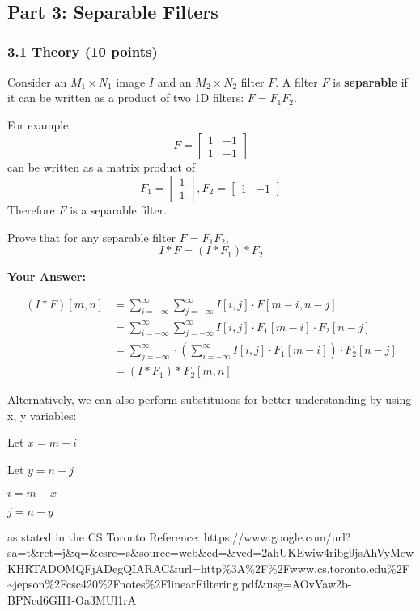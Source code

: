 \documentclass[11pt]{article}
\begin{document}
    \begin{center}
    \end{center}
    { \hspace*{\fill} \\}
    
    \subsection{Part 3: Separable Filters}\label{part-3-separable-filters}

    \subsubsection{3.1 Theory (10 points)}\label{theory-10-points}

Consider an \(M_1\times{N_1}\) image \(I\) and an \(M_2\times{N_2}\)
filter \(F\). A filter \(F\) is \textbf{separable} if it can be written
as a product of two 1D filters: \(F=F_1F_2\).

For example, \[F=
\begin{bmatrix}
1 & -1 \\
1 & -1
\end{bmatrix}
\] can be written as a matrix product of \[F_1=
\begin{bmatrix}
1  \\
1
\end{bmatrix},
F_2=
\begin{bmatrix}
1 & -1
\end{bmatrix}
\] Therefore \(F\) is a separable filter.

Prove that for any separable filter \(F=F_1F_2\), \[I*F=(I*F_1)*F_2\]

    \textbf{Your Answer:}

\begin{align*}
(I*F) [m,n] &= \sum_{i=-\infty}^\infty \sum_{j=-\infty}^\infty I[i,j]\cdot F[m-i,n-j]\\
&= \sum_{i=-\infty}^\infty \sum_{j=-\infty}^\infty I[i,j]\cdot F_1[m-i]\cdot F_2[n-j]\\
&= \sum_{j=-\infty}^\infty \cdot\left(\sum_{i=-\infty}^\infty I[i,j]\cdot F_1[m-i]\right)\cdot F_2[n-j]\\
&= (I * F_1) * F_2 [m,n]
\end{align*}

Alternatively, we can also perform substituions for better understanding
by using x, y variables:

Let \(x = m - i\)

Let \(y = n -j\)

\(i = m - x\)

\(j = n -y\)

as stated in the CS Toronto Reference:
https://www.google.com/url?sa=t\&rct=j\&q=\&esrc=s\&source=web\&cd=\&ved=2ahUKEwiw4ribg9jsAhVyMewKHRTADOMQFjADegQIARAC\&url=http\%3A\%2F\%2Fwww.cs.toronto.edu\%2F\textasciitilde{}jepson\%2Fcsc420\%2Fnotes\%2FlinearFiltering.pdf\&usg=AOvVaw2b-BPNcd6GH1-Oa3MUl1rA


    
    
    
    
\end{document}
